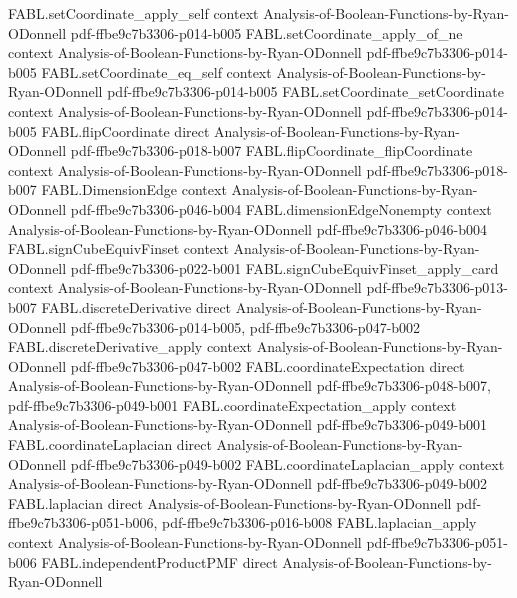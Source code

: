 \begin{theorem}
\proofstep
  {FABL.setCoordinate_apply_self}
  {context}
  {Analysis-of-Boolean-Functions-by-Ryan-ODonnell}
  {pdf-ffbe9c7b3306-p014-b005}
\proofstep
  {FABL.setCoordinate_apply_of_ne}
  {context}
  {Analysis-of-Boolean-Functions-by-Ryan-ODonnell}
  {pdf-ffbe9c7b3306-p014-b005}
\proofstep
  {FABL.setCoordinate_eq_self}
  {context}
  {Analysis-of-Boolean-Functions-by-Ryan-ODonnell}
  {pdf-ffbe9c7b3306-p014-b005}
\proofstep
  {FABL.setCoordinate_setCoordinate}
  {context}
  {Analysis-of-Boolean-Functions-by-Ryan-ODonnell}
  {pdf-ffbe9c7b3306-p014-b005}
\proofstep
  {FABL.flipCoordinate}
  {direct}
  {Analysis-of-Boolean-Functions-by-Ryan-ODonnell}
  {pdf-ffbe9c7b3306-p018-b007}
\proofstep
  {FABL.flipCoordinate_flipCoordinate}
  {context}
  {Analysis-of-Boolean-Functions-by-Ryan-ODonnell}
  {pdf-ffbe9c7b3306-p018-b007}
\proofstep
  {FABL.DimensionEdge}
  {context}
  {Analysis-of-Boolean-Functions-by-Ryan-ODonnell}
  {pdf-ffbe9c7b3306-p046-b004}
\proofstep
  {FABL.dimensionEdgeNonempty}
  {context}
  {Analysis-of-Boolean-Functions-by-Ryan-ODonnell}
  {pdf-ffbe9c7b3306-p046-b004}
\proofstep
  {FABL.signCubeEquivFinset}
  {context}
  {Analysis-of-Boolean-Functions-by-Ryan-ODonnell}
  {pdf-ffbe9c7b3306-p022-b001}
\proofstep
  {FABL.signCubeEquivFinset_apply_card}
  {context}
  {Analysis-of-Boolean-Functions-by-Ryan-ODonnell}
  {pdf-ffbe9c7b3306-p013-b007}
\proofstep
  {FABL.discreteDerivative}
  {direct}
  {Analysis-of-Boolean-Functions-by-Ryan-ODonnell}
  {pdf-ffbe9c7b3306-p014-b005,
    pdf-ffbe9c7b3306-p047-b002}
\proofstep
  {FABL.discreteDerivative_apply}
  {context}
  {Analysis-of-Boolean-Functions-by-Ryan-ODonnell}
  {pdf-ffbe9c7b3306-p047-b002}
\proofstep
  {FABL.coordinateExpectation}
  {direct}
  {Analysis-of-Boolean-Functions-by-Ryan-ODonnell}
  {pdf-ffbe9c7b3306-p048-b007,
    pdf-ffbe9c7b3306-p049-b001}
\proofstep
  {FABL.coordinateExpectation_apply}
  {context}
  {Analysis-of-Boolean-Functions-by-Ryan-ODonnell}
  {pdf-ffbe9c7b3306-p049-b001}
\proofstep
  {FABL.coordinateLaplacian}
  {direct}
  {Analysis-of-Boolean-Functions-by-Ryan-ODonnell}
  {pdf-ffbe9c7b3306-p049-b002}
\proofstep
  {FABL.coordinateLaplacian_apply}
  {context}
  {Analysis-of-Boolean-Functions-by-Ryan-ODonnell}
  {pdf-ffbe9c7b3306-p049-b002}
\proofstep
  {FABL.laplacian}
  {direct}
  {Analysis-of-Boolean-Functions-by-Ryan-ODonnell}
  {pdf-ffbe9c7b3306-p051-b006,
    pdf-ffbe9c7b3306-p016-b008}
\proofstep
  {FABL.laplacian_apply}
  {context}
  {Analysis-of-Boolean-Functions-by-Ryan-ODonnell}
  {pdf-ffbe9c7b3306-p051-b006}
\proofstep
  {FABL.independentProductPMF}
  {direct}
  {Analysis-of-Boolean-Functions-by-Ryan-ODonnell}

\end{theorem}
